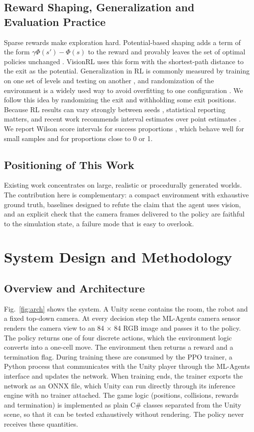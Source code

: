 \documentclass[conference]{IEEEtran}
\begin{document}
\subsection{Reward Shaping, Generalization and Evaluation Practice}
Sparse rewards make exploration hard. Potential-based shaping adds a term of the form $\gamma\Phi(s') - \Phi(s)$ to the reward and provably leaves the set of optimal policies unchanged \cite{ng1999shaping}. VisionRL uses this form with the shortest-path distance to the exit as the potential. Generalization in RL is commonly measured by training on one set of levels and testing on another \cite{cobbe2019quantifying,cobbe2020procgen}, and randomization of the environment is a widely used way to avoid overfitting to one configuration \cite{tobin2017domain}. We follow this idea by randomizing the exit and withholding some exit positions. Because RL results can vary strongly between seeds \cite{henderson2018matters}, statistical reporting matters, and recent work recommends interval estimates over point estimates \cite{agarwal2021precipice}. We report Wilson score intervals for success proportions \cite{wilson1927,brown2001}, which behave well for small samples and for proportions close to 0 or 1.


\subsection{Positioning of This Work}
Existing work concentrates on large, realistic or procedurally generated worlds. The contribution here is complementary: a compact environment with exhaustive ground truth, baselines designed to refute the claim that the agent uses vision, and an explicit check that the camera frames delivered to the policy are faithful to the simulation state, a failure mode that is easy to overlook.


\section{System Design and Methodology}\label{sec:method}

\subsection{Overview and Architecture}
Fig.~\ref{fig:arch} shows the system. A Unity scene contains the room, the robot and a fixed top-down camera. At every decision step the ML-Agents camera sensor renders the camera view to an 84 $\times$ 84 RGB image and passes it to the policy. The policy returns one of four discrete actions, which the environment logic converts into a one-cell move. The environment then returns a reward and a termination flag. During training these are consumed by the PPO trainer, a Python process that communicates with the Unity player through the ML-Agents interface and updates the network. When training ends, the trainer exports the network as an ONNX file, which Unity can run directly through its inference engine with no trainer attached. The game logic (positions, collisions, rewards and termination) is implemented as plain C\# classes separated from the Unity scene, so that it can be tested exhaustively without rendering. The policy never receives these quantities.
\end{document}
